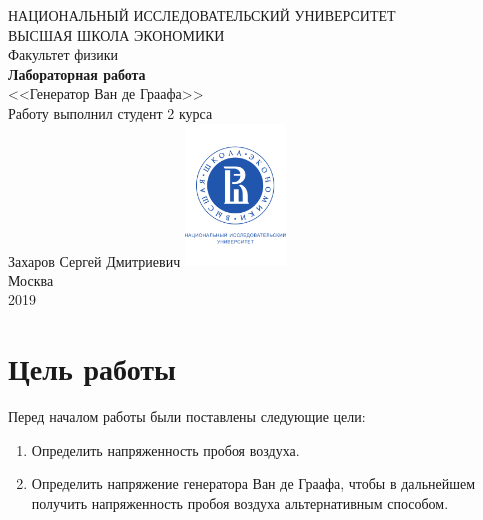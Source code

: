 \documentclass[a4paper, 12pt]{article}
\begin{document}
	\begin{titlepage}
		\begin{center}
			$$$$
			$$$$
			$$$$
			$$$$
			{\Large{НАЦИОНАЛЬНЫЙ ИССЛЕДОВАТЕЛЬСКИЙ УНИВЕРСИТЕТ}}\\
			\vspace{0.1cm}
			{\Large{ВЫСШАЯ ШКОЛА ЭКОНОМИКИ}}\\
			\vspace{0.25cm}
			{\large{Факультет физики}}\\
			\vspace{5.5cm}
			{\Huge\textbf{{Лабораторная работа}}}\\%
			\vspace{1cm}
			{\LARGE{<<Генератор Ван де Граафа>>}}\\%
			\vspace{2cm}
			{Работу выполнил студент 2 курса}\\
			{Захаров Сергей Дмитриевич}
			\vfill
			\includegraphics[width = 0.2\textwidth]{HSElogo}\\
			\vfill
			Москва\\
			2019
		\end{center}
	\end{titlepage}

\tableofcontents

\newpage

\section{Цель работы}

Перед началом работы были поставлены следующие цели:

\begin{enumerate}
	\item Определить напряженность пробоя воздуха.
	
	\item Определить напряжение генератора Ван де Граафа, чтобы в дальнейшем получить напряженность пробоя воздуха альтернативным способом.
\end{enumerate}
\end{document}
